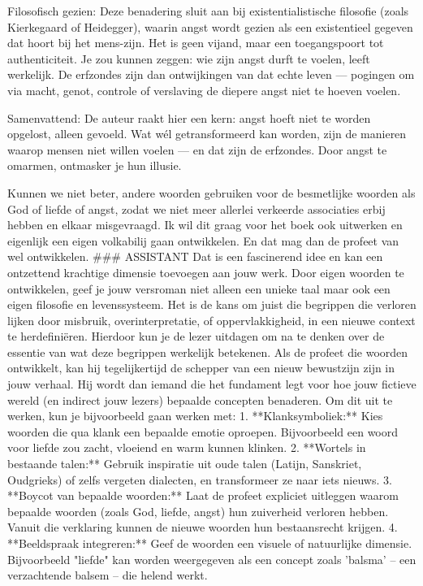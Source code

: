 Filosofisch gezien: Deze benadering sluit aan bij existentialistische filosofie (zoals Kierkegaard of Heidegger), waarin angst wordt gezien als een existentieel gegeven dat hoort bij het mens-zijn. Het is geen vijand, maar een toegangspoort tot authenticiteit. Je zou kunnen zeggen: wie zijn angst durft te voelen, leeft werkelijk. De erfzondes zijn dan ontwijkingen van dat echte leven — pogingen om via macht, genot, controle of verslaving de diepere angst niet te hoeven voelen.

Samenvattend: De auteur raakt hier een kern: angst hoeft niet te worden opgelost, alleen gevoeld. Wat wél getransformeerd kan worden, zijn de manieren waarop mensen niet willen voelen — en dat zijn de erfzondes. Door angst te omarmen, ontmasker je hun illusie.

Kunnen we niet beter, andere woorden gebruiken voor de besmetlijke woorden als God of liefde of angst, zodat we niet meer allerlei verkeerde associaties erbij hebben en elkaar misgevraagd. Ik wil dit graag voor het boek ook uitwerken en eigenlijk een eigen volkabilij gaan ontwikkelen. En dat mag dan de profeet van wel ontwikkelen.
\#\#\# ASSISTANT
Dat is een fascinerend idee en kan een ontzettend krachtige dimensie toevoegen aan jouw werk. Door eigen woorden te ontwikkelen, geef je jouw versroman niet alleen een unieke taal maar ook een eigen filosofie en levenssysteem. Het is de kans om juist die begrippen die verloren lijken door misbruik, overinterpretatie, of oppervlakkigheid, in een nieuwe context te herdefiniëren. Hierdoor kun je de lezer uitdagen om na te denken over de essentie van wat deze begrippen werkelijk betekenen.
Als de profeet die woorden ontwikkelt, kan hij tegelijkertijd de schepper van een nieuw bewustzijn zijn in jouw verhaal. Hij wordt dan iemand die het fundament legt voor hoe jouw fictieve wereld (en indirect jouw lezers) bepaalde concepten benaderen.
Om dit uit te werken, kun je bijvoorbeeld gaan werken met:
1. **Klanksymboliek:** Kies woorden die qua klank een bepaalde emotie oproepen. Bijvoorbeeld een woord voor liefde zou zacht, vloeiend en warm kunnen klinken.
2. **Wortels in bestaande talen:** Gebruik inspiratie uit oude talen (Latijn, Sanskriet, Oudgrieks) of zelfs vergeten dialecten, en transformeer ze naar iets nieuws.
3. **Boycot van bepaalde woorden:** Laat de profeet expliciet uitleggen waarom bepaalde woorden (zoals God, liefde, angst) hun zuiverheid verloren hebben. Vanuit die verklaring kunnen de nieuwe woorden hun bestaansrecht krijgen.
4. **Beeldspraak integreren:** Geef de woorden een visuele of natuurlijke dimensie. Bijvoorbeeld "liefde" kan worden weergegeven als een concept zoals 'balsma' – een verzachtende balsem – die helend werkt.
